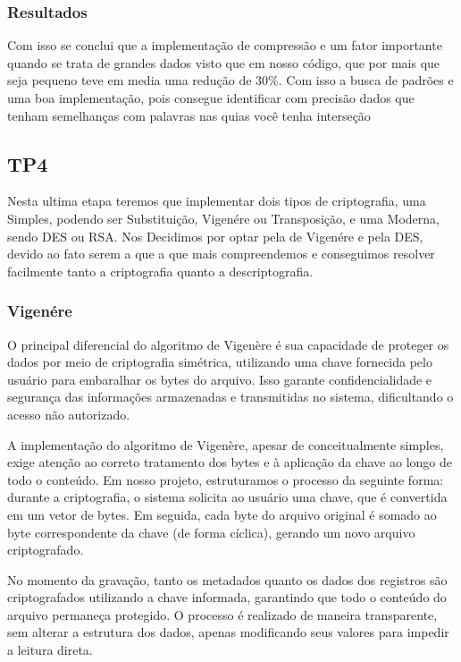 \documentclass[12pt]{article}
\begin{document}
\subsubsection{Resultados}
Com isso se conclui que a implementação de compressão e um fator importante quando se trata de grandes dados visto que em nosso código, que por mais que seja pequeno teve em media uma redução de 30\%. Com isso a busca de padrões e uma boa implementação, pois consegue identificar com precisão dados que tenham semelhanças com palavras nas quias você tenha interseção

\subsection{TP4}

Nesta ultima etapa teremos que implementar dois tipos de criptografia, uma Simples, podendo ser Substituição, Vigenére ou Transposição, e uma Moderna, sendo DES ou RSA.
Nos Decidimos por optar pela de Vigenére e pela DES, devido ao fato serem a que a que mais compreendemos e conseguimos resolver facilmente tanto a criptografia quanto a descriptografia.

\vspace{-4cm}

\subsubsection{Vigenére}
O principal diferencial do algoritmo de Vigenère é sua capacidade de proteger os dados por meio de criptografia simétrica, utilizando uma chave fornecida pelo usuário para embaralhar os bytes do arquivo. Isso garante confidencialidade e segurança das informações armazenadas e transmitidas no sistema, dificultando o acesso não autorizado.

A implementação do algoritmo de Vigenère, apesar de conceitualmente simples, exige atenção ao correto tratamento dos bytes e à aplicação da chave ao longo de todo o conteúdo. Em nosso projeto, estruturamos o processo da seguinte forma: durante a criptografia, o sistema solicita ao usuário uma chave, que é convertida em um vetor de bytes. Em seguida, cada byte do arquivo original é somado ao byte correspondente da chave (de forma cíclica), gerando um novo arquivo criptografado.

No momento da gravação, tanto os metadados quanto os dados dos registros são criptografados utilizando a chave informada, garantindo que todo o conteúdo do arquivo permaneça protegido. O processo é realizado de maneira transparente, sem alterar a estrutura dos dados, apenas modificando seus valores para impedir a leitura direta.
\end{document}
